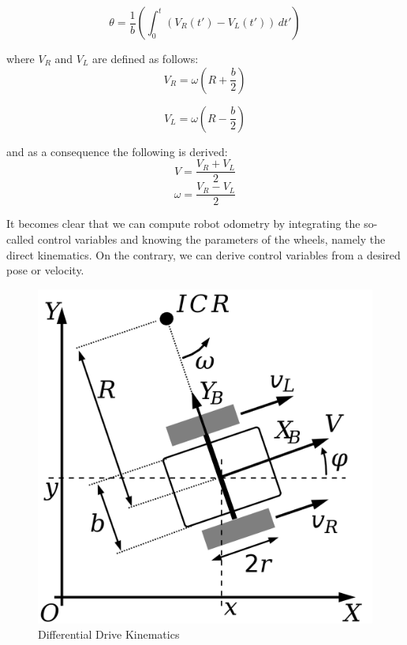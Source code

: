 \begin{equation}
    \theta = \frac{1}{b}(\int_{0}^{t} (V_{R}(t') - V_{L}(t')) \,dt')
\end{equation}


where $V_{R}$ and $V_{L}$ are defined as follows:
\begin{equation}
    V_{R} = \omega (R + \frac{b}{2}) 
\end{equation}

\begin{equation}
        V_{L} = \omega (R - \frac{b}{2})
\end{equation}

and as a consequence the following is derived:
\begin{equation}
    V = \frac{V_{R} + V_{L}}{2}
\end{equation}
\begin{equation}
    \omega = \frac{V_{R} - V_{L}}{2}
\end{equation}

It becomes clear that we can compute robot odometry by integrating the so-called control variables and knowing the parameters of the wheels, namely the direct kinematics.
On the contrary, we can derive control variables from a desired pose or velocity.


\begin{figure}[H]
    \centering
    \includegraphics[scale=0.10]{Images/Chapter 3/diffdrive.png}
    \caption{Differential Drive Kinematics}
    \label{fig:diffdrive}
\end{figure}

